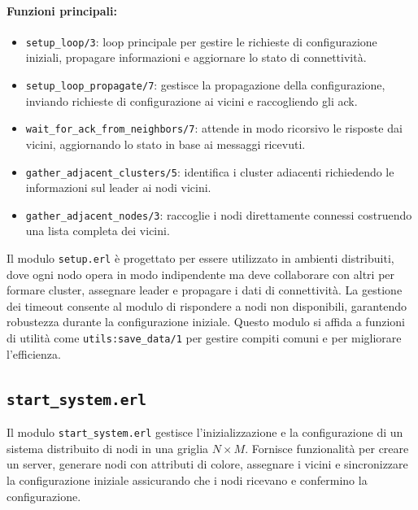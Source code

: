 \documentclass[12pt, a4paper]{report}
\begin{document}
\paragraph{Funzioni principali:}
\begin{itemize}
    \item \texttt{setup\_loop/3}: loop principale per gestire le richieste di configurazione iniziali, propagare informazioni e aggiornare lo stato di connettività.
    \item \texttt{setup\_loop\_propagate/7}: gestisce la propagazione della configurazione, inviando richieste di configurazione ai vicini e raccogliendo gli ack.
    \item \texttt{wait\_for\_ack\_from\_neighbors/7}: attende in modo ricorsivo le risposte dai vicini, aggiornando lo stato in base ai messaggi ricevuti.
    \item \texttt{gather\_adjacent\_clusters/5}: identifica i cluster adiacenti richiedendo le informazioni sul leader ai nodi vicini.
    \item \texttt{gather\_adjacent\_nodes/3}: raccoglie i nodi direttamente connessi costruendo una lista completa dei vicini.
\end{itemize}

\noindent
Il modulo \texttt{setup.erl} \`e progettato per essere utilizzato in ambienti distribuiti, dove ogni nodo opera in modo indipendente ma deve collaborare con altri per formare cluster, assegnare leader e propagare i dati di connettività. La gestione dei timeout consente al modulo di rispondere a nodi non disponibili, garantendo robustezza durante la configurazione iniziale. Questo modulo si affida a funzioni di utilità come \texttt{utils:save\_data/1} per gestire compiti comuni e per migliorare l'efficienza.

\subsection{\texttt{start\_system.erl}}

Il modulo \texttt{start\_system.erl} gestisce l'inizializzazione e la configurazione di un sistema distribuito di nodi in una griglia $N \times M$. Fornisce funzionalità per creare un server, generare nodi con attributi di colore, assegnare i vicini e sincronizzare la configurazione iniziale assicurando che i nodi ricevano e confermino la configurazione.
\end{document}
